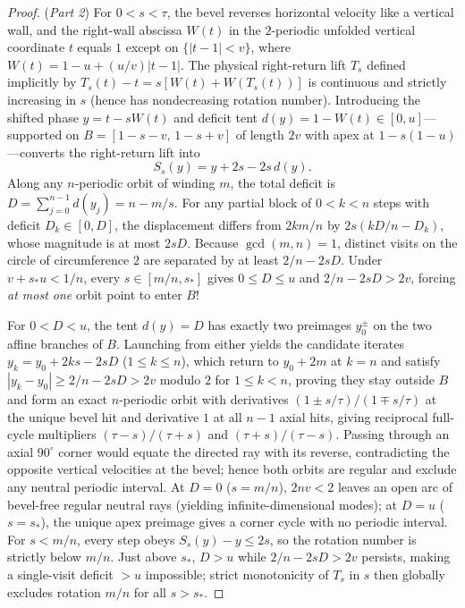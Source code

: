 \documentclass[11pt,reqno]{amsart}
\theoremstyle{definition}
\theoremstyle{remark}
\begin{document}
\begin{proof}
(\emph{Part 2}) For $0 < s < \tau$, the bevel reverses horizontal velocity like a vertical wall, and the right-wall abscissa $W(t)$ in the $2$-periodic unfolded vertical coordinate $t$ equals $1$ except on $\{|t - 1| < v\}$, where $W(t) = 1 - u + (u/v)|t - 1|$. The physical right-return lift $T_s$ defined implicitly by $T_s(t) - t = s[W(t) + W(T_s(t))]$ is continuous and strictly increasing in $s$ (hence has nondecreasing rotation number). Introducing the shifted phase $y = t - s W(t)$ and deficit tent $d(y) = 1 - W(t) \in [0, u]$---supported on $B = [1-s-v,\, 1-s+v]$ of length $2v$ with apex at $1 - s(1-u)$---converts the right-return lift into
\[
  S_s(y) = y + 2s - 2s\,d(y).
\]
Along any $n$-periodic orbit of winding $m$, the total deficit is $D = \sum_{j=0}^{n-1} d(y_j) = n - m/s$. For any partial block of $0 < k < n$ steps with deficit $D_k \in [0, D]$, the displacement differs from $2km/n$ by $2s(kD/n - D_k)$, whose magnitude is at most $2sD$. Because $\gcd(m,n) = 1$, distinct visits on the circle of circumference $2$ are separated by at least $2/n - 2sD$. Under $v + s_* u < 1/n$, every $s \in [m/n, s_*]$ gives $0 \le D \le u$ and $2/n - 2sD > 2v$, forcing \emph{at most one} orbit point to enter $B$!

For $0 < D < u$, the tent $d(y) = D$ has exactly two preimages $y_0^\pm$ on the two affine branches of $B$. Launching from either yields the candidate iterates $y_k = y_0 + 2ks - 2sD$ ($1 \le k \le n$), which return to $y_0 + 2m$ at $k = n$ and satisfy $|y_k - y_0| \ge 2/n - 2sD > 2v$ modulo $2$ for $1 \le k < n$, proving they stay outside $B$ and form an exact $n$-periodic orbit with derivatives $(1 \pm s/\tau)/(1 \mp s/\tau)$ at the unique bevel hit and derivative $1$ at all $n-1$ axial hits, giving reciprocal full-cycle multipliers $(\tau - s)/(\tau + s)$ and $(\tau + s)/(\tau - s)$. Passing through an axial $90^\circ$ corner would equate the directed ray with its reverse, contradicting the opposite vertical velocities at the bevel; hence both orbits are regular and exclude any neutral periodic interval. At $D = 0$ ($s = m/n$), $2nv < 2$ leaves an open arc of bevel-free regular neutral rays (yielding infinite-dimensional modes); at $D = u$ ($s = s_*$), the unique apex preimage gives a corner cycle with no periodic interval. For $s < m/n$, every step obeys $S_s(y) - y \le 2s$, so the rotation number is strictly below $m/n$. Just above $s_*$, $D > u$ while $2/n - 2sD > 2v$ persists, making a single-visit deficit $> u$ impossible; strict monotonicity of $T_s$ in $s$ then globally excludes rotation $m/n$ for all $s > s_*$.


\end{proof}
\end{document}
